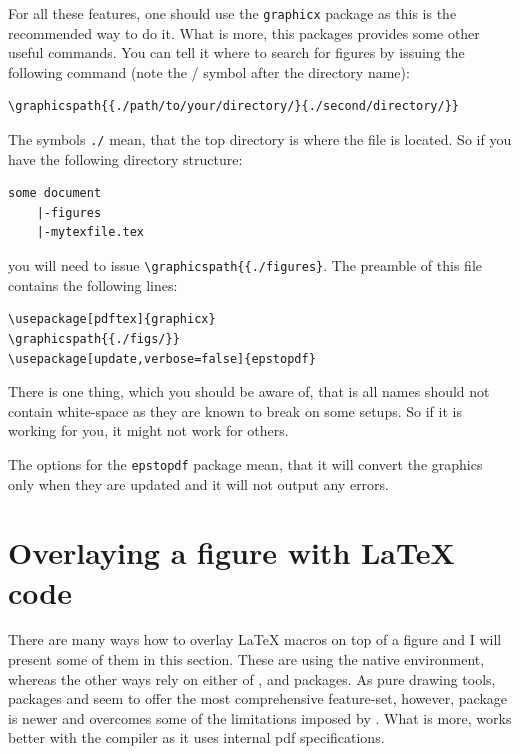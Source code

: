 \documentclass[
]{scrartcl}
\begin{document}
%
For all these features, one should use the \verb|graphicx| package as this is
    the recommended way to do it. 
%
What is more, this packages provides some other useful commands. 
%
You can tell it where to search for figures by issuing the following command
    (note the / symbol after the directory name):
%
\begin{lstlisting}
\graphicspath{{./path/to/your/directory/}{./second/directory/}}    
\end{lstlisting}
%
The symbols \verb|./| mean, that the top directory is where the  file
    is located. 
%
So if you have the following directory structure:
%
\begin{lstlisting}
some document
    |-figures
    |-mytexfile.tex
\end{lstlisting}
    you will need to issue \verb|\graphicspath{{./figures}|. 
%
The preamble of this file contains the following lines:
%
\begin{lstlisting}
\usepackage[pdftex]{graphicx}
\graphicspath{{./figs/}}
\usepackage[update,verbose=false]{epstopdf}
\end{lstlisting}
%
There is one thing, which you should be aware of, that is all names should not
    contain white-space as they are known to break on some setups.
%
So if it is working for you, it might not work for others.

%
The options for the \verb|epstopdf| package mean, that it will convert the
     graphics only when they are updated and it will not output any
    errors.

\clearpage
\section{Overlaying a figure with \LaTeX{} code}

%
There are many ways how to overlay \LaTeX{} macros on top of a figure and I will
    present some of them in this section.
%
These are using the native  environment, whereas the other ways
    rely on either of ,  and  packages.
%
As pure drawing tools, packages  and  seem to offer the
    most comprehensive feature-set, however,  package is newer and
    overcomes some of the limitations imposed by .
%
What is more,  works better with the  compiler as it
    uses internal pdf specifications.
\end{document}
